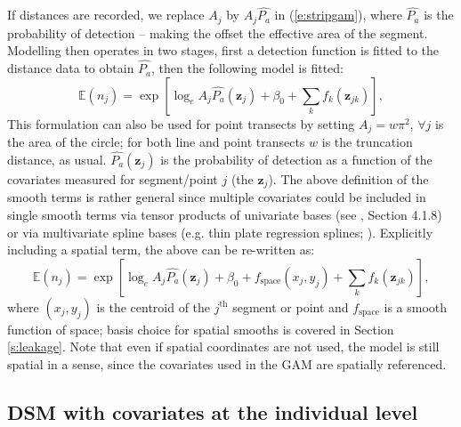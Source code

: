 \documentclass[a4paper,12pt]{article}
\begin{document}
If distances are recorded, we replace $A_j$ by $A_j\hat{P_a}$ in (\ref{e:stripgam}), where $\hat{P_a}$ is the probability of detection -- making the offset the effective area of the segment. Modelling then operates in two stages, first a detection function is fitted to the distance data to obtain $\hat{P_a}$, then the following model is fitted:
\begin{equation}
\mathbb{E}(n_j) = \exp\left[ \log_e A_j\hat{P_a}(\mathbf{z}_j) + \beta_0 + \sum_k f_k\left(\bm{z}_{jk}\right) \right],
\label{e:gamn}
\end{equation}
This formulation can also be used for point transects by setting $A_j=w\pi^2$, $\forall j$ is the area of the circle; for both line and point transects $w$ is the truncation distance, as usual. $\hat{P_a}(\mathbf{z}_j)$ is the probability of detection as a function of the covariates measured for segment/point $j$ (the $\mathbf{z}_j$). The above definition of the smooth terms is rather general since multiple covariates could be included in single smooth terms via tensor products of univariate bases (see \cite{Wood:2006wz}, Section 4.1.8) or via multivariate spline bases (e.g. thin plate regression splines; \cite{Wood:2003tc}). Explicitly including a spatial term, the above can be re-written as:
\begin{equation*}
\mathbb{E}(n_j) = \exp\left[ \log_e A_j \hat{P_a}(\mathbf{z}_j) + \beta_0 + f_\text{space}\left(x_j,y_j\right) + \sum_k f_k \left(\bm{z}_{jk}\right) \right],
\end{equation*}
where $(x_j,y_j)$ is the centroid of the $j^\text{th}$ segment or point and $f_\text{space}$ is a smooth function of space; basis choice for spatial smooths is covered in Section \ref{s:leakage}. Note that even if spatial coordinates are not used, the model is still spatial in a sense, since the covariates used in the GAM are spatially referenced.

\subsection*{DSM with covariates at the individual level}
\end{document}
